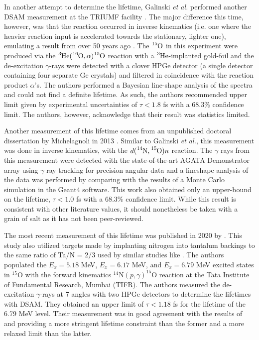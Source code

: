 In another attempt to determine the lifetime, Galinski \textit{et al.} performed another DSAM measurement at the TRIUMF facility \cite{Galinski2014}. The major difference this time, however, was that the reaction occurred in inverse kinematics (i.e. one where the heavier reaction input is accelerated towards the stationary, lighter one), emulating a result from over 50 years ago \cite{Gill1968}. The $\ce{^{15}O}$ in this experiment were produced via the $\ce{^{3}He}(\ce{^{16}O},\alpha)\ce{^{15}O}$ reaction with a $\ce{^{3}He}$-implanted gold-foil and the de-excitation $\gamma$-rays were detected with a clover HPGe detector (a single detector containing four separate Ge crystals) and filtered in coincidence with the reaction product $\alpha$'s. The authors performed a Bayesian line-shape analysis of the spectra and could not find a definite lifetime. As such, the authors recommended upper limit given by experimental uncertainties of $\tau < 1.8$ fs with a 68.3\% confidence limit. The authors, however, acknowledge that their result was statistics limited.

Another measurement of this lifetime comes from an unpublished doctoral dissertation by Michelagnoli in 2013 \cite{Michelagnoli2013}. Similar to Galinski \textit{et al.}, this measurement was done in inverse kinematics, with the $d(\ce{^{14}N},\ce{^{15}O})n$ reaction. The $\gamma$ rays from this measurement were detected with the state-of-the-art AGATA Demonstrator array using $\gamma$-ray tracking for precision angular data and a lineshape analysis of the data was performed by comparing with the results of a Monte Carlo simulation in the Geant4 software. This work also obtained only an upper-bound on the lifetime, $\tau < 1.0$ fs with a 68.3\% confidence limit. While this result is consistent with other literature values, it should nonetheless be taken with a grain of salt as it has not been peer-reviewed. 

The most recent measurement of this lifetime was published in 2020 by \citet{Sharma2020}. This study also utilized targets made by implanting nitrogen into tantalum backings to the same ratio of Ta/N = 2/3 used by similar studies like \cite{Bertone2001, Schurmann2008, Daigle2016}. The authors populated the $E_{x} = 5.18$ MeV, $E_{x} = 6.17$ MeV, and $E_{x} = 6.79$ MeV excited states in $^{15}$O with the forward kinematics $^{14}$N$\left( p,\gamma \right) ^{15}$O reaction at the Tata Institute of Fundamental Research, Mumbai (TIFR). The authors measured the de-excitation $\gamma$-rays at 7 angles with two HPGe detectors to determine the lifetimes with DSAM. They obtained an upper limit of $\tau < 1.18$ fs for the lifetime of the 6.79 MeV level. Their measurement was in good agreement with the results of \citet{Galinski2014} and \citet{Schurmann2008} providing a more stringent lifetime constraint than the former and a more relaxed limit than the latter. 


